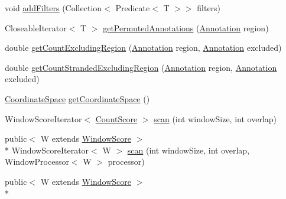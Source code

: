 \begin{DoxyCompactItemize}
\item 
void \hyperlink{interfaceumms_1_1core_1_1annotation_1_1_annotation_collection_3_01_t_01extends_01_annotation_01_4_a13dc10dfecda05ca890e822f4da43076}{add\+Filters} (Collection$<$ Predicate$<$ T $>$$>$ filters)
\item 
Closeable\+Iterator$<$ T $>$ \hyperlink{interfaceumms_1_1core_1_1annotation_1_1_annotation_collection_3_01_t_01extends_01_annotation_01_4_a83cb095bf99eafd3075bdf8d75da422f}{get\+Permuted\+Annotations} (\hyperlink{interfaceumms_1_1core_1_1annotation_1_1_annotation}{Annotation} region)
\item 
double \hyperlink{interfaceumms_1_1core_1_1annotation_1_1_annotation_collection_3_01_t_01extends_01_annotation_01_4_a176fffae65aa5c43dabb697cc3e7a961}{get\+Count\+Excluding\+Region} (\hyperlink{interfaceumms_1_1core_1_1annotation_1_1_annotation}{Annotation} region, \hyperlink{interfaceumms_1_1core_1_1annotation_1_1_annotation}{Annotation} excluded)
\item 
double \hyperlink{interfaceumms_1_1core_1_1annotation_1_1_annotation_collection_3_01_t_01extends_01_annotation_01_4_a4bad301160c77622b557cef7d2f5a725}{get\+Count\+Stranded\+Excluding\+Region} (\hyperlink{interfaceumms_1_1core_1_1annotation_1_1_annotation}{Annotation} region, \hyperlink{interfaceumms_1_1core_1_1annotation_1_1_annotation}{Annotation} excluded)
\item 
\hyperlink{interfaceumms_1_1core_1_1coordinatesystem_1_1_coordinate_space}{Coordinate\+Space} \hyperlink{interfaceumms_1_1core_1_1annotation_1_1_annotation_collection_3_01_t_01extends_01_annotation_01_4_a681707090e9b5e55e0b51a3ef791857c}{get\+Coordinate\+Space} ()
\item 
Window\+Score\+Iterator$<$ \hyperlink{classumms_1_1core_1_1model_1_1score_1_1_count_score}{Count\+Score} $>$ \hyperlink{interfaceumms_1_1core_1_1annotation_1_1_annotation_collection_3_01_t_01extends_01_annotation_01_4_a2120916c9e1d07c8a5acff623534eebc}{scan} (int window\+Size, int overlap)
\item 
public$<$ W extends \hyperlink{interfaceumms_1_1core_1_1model_1_1score_1_1_window_score}{Window\+Score} $>$\\*
 Window\+Score\+Iterator$<$ W $>$ \hyperlink{interfaceumms_1_1core_1_1annotation_1_1_annotation_collection_3_01_t_01extends_01_annotation_01_4_a9086d2b39dc2731d1a8ba0c28c8131cb}{scan} (int window\+Size, int overlap, Window\+Processor$<$ W $>$ processor)
\item 
public$<$ W extends \hyperlink{interfaceumms_1_1core_1_1model_1_1score_1_1_window_score}{Window\+Score} $>$\\*
$$
\end{DoxyCompactItemize}

